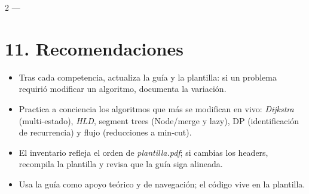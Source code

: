 \documentclass[10pt]{article}
\begin{document}
\begin{multicols}{2}
---

\section*{11. Recomendaciones}
\begin{itemize}\setlength{\itemsep}{1pt}
  \item Tras cada competencia, actualiza la guía y la plantilla: si un problema requirió modificar un algoritmo, documenta la variación.
  \item Practica a conciencia los algoritmos que más se modifican en vivo: \textit{Dijkstra} (multi-estado), \textit{HLD}, segment trees (Node/merge y lazy), DP (identificación de recurrencia) y flujo (reducciones a min-cut).
  \item El inventario refleja el orden de \textit{plantilla.pdf}; si cambias los headers, recompila la plantilla y revisa que la guía siga alineada.
  \item Usa la guía como apoyo teórico y de navegación; el código vive en la plantilla.
\end{itemize}

\end{multicols}
\end{document}
